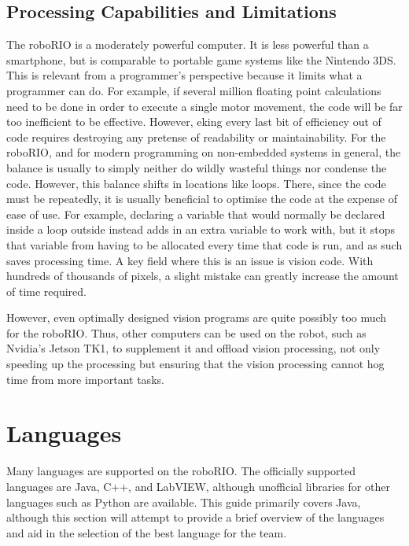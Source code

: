 \documentclass[]{report}
\begin{document}
\subsection{Processing Capabilities and Limitations}
The roboRIO is a moderately powerful computer.
It is less powerful than a smartphone, but is comparable to portable game systems like the Nintendo 3DS.
This is relevant from a programmer's perspective because it limits what a programmer can do.
For example, if several million floating point calculations need to be done in order to execute a single motor movement, the code will be far too inefficient to be effective.
However, eking every last bit of efficiency out of code requires destroying any pretense of readability or maintainability.
For the roboRIO, and for modern programming on non-embedded systems in general, the balance is usually to simply neither do wildly wasteful things nor condense the code.
However, this balance shifts in locations like loops. There, since the code must be repeatedly, it is usually beneficial to optimise the code at the expense of ease of use.
For example, declaring a variable that would normally be declared inside a loop outside instead adds in an extra variable to work with, but it stops that variable from having to be allocated every time that code is run, and as such saves processing time.
A key field where this is an issue is vision code.
With hundreds of thousands of pixels, a slight mistake can greatly increase the amount of time required.

However, even optimally designed vision programs are quite possibly too much for the roboRIO.
Thus, other computers can be used on the robot, such as Nvidia's Jetson TK1, to supplement it and offload vision processing, not only speeding up the processing but ensuring that the vision processing cannot hog time from more important tasks.


\section{Languages}
Many languages are supported on the roboRIO.
The officially supported languages are Java, C++, and LabVIEW, although unofficial libraries for other languages such as Python are available.
This guide primarily covers Java, although this section will attempt to provide a brief overview of the languages and aid in the selection of the best language for the team.
\end{document}
